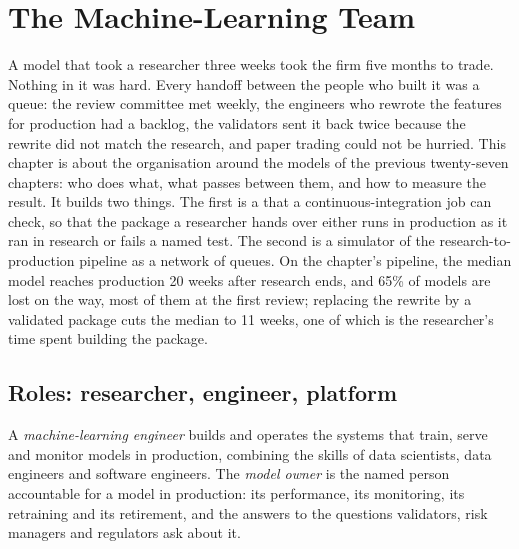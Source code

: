 \chapter{The Machine-Learning Team}\label{ch:ml:the-machine-learning-team}

A model that took a researcher three weeks took the firm five months to trade. Nothing in it was hard. Every handoff between the
people who built it was a queue: the review committee met weekly, the engineers who rewrote the features for production had a
backlog, the validators sent it back twice because the rewrite did not match the research, and paper trading could not be
hurried. This chapter is about the organisation around the models of the previous twenty-seven chapters: who does what, what
passes between them, and how to measure the result. It builds two things. The first is a  that a
continuous-integration job can check, so that the package a researcher hands over either runs in production as it ran in
research or fails a named test. The second is a simulator of the research-to-production pipeline as a network of queues. On the
chapter's pipeline, the median model reaches production 20 weeks after research ends, and 65\% of models are lost on the way,
most of them at the first review; replacing the rewrite by a validated package cuts the median to 11 weeks, one of which is the
researcher's time spent building the package.

\section{Roles: researcher, engineer, platform}

\begin{definition}\label{def:ml:the-machine-learning-team:roles}
A \emph{machine-learning engineer} builds and operates the systems that train, serve and monitor
models in production, combining the skills of data scientists, data engineers and software engineers. The \emph{model
owner} is the named person accountable for a model in production: its performance, its monitoring, its
retraining and its retirement, and the answers to the questions validators, risk managers and regulators ask about it.
\end{definition}

